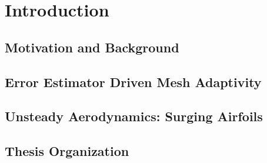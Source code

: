  
\chapter{Introduction}

\section{Motivation and Background}
\label{sec:motivation}




\section{Error Estimator Driven Mesh Adaptivity}
\label{sec:intro_ee}



\section{Unsteady Aerodynamics: Surging Airfoils}
\label{sec:surging}



\section{Thesis Organization}
\label{sec:thesis_organization}

